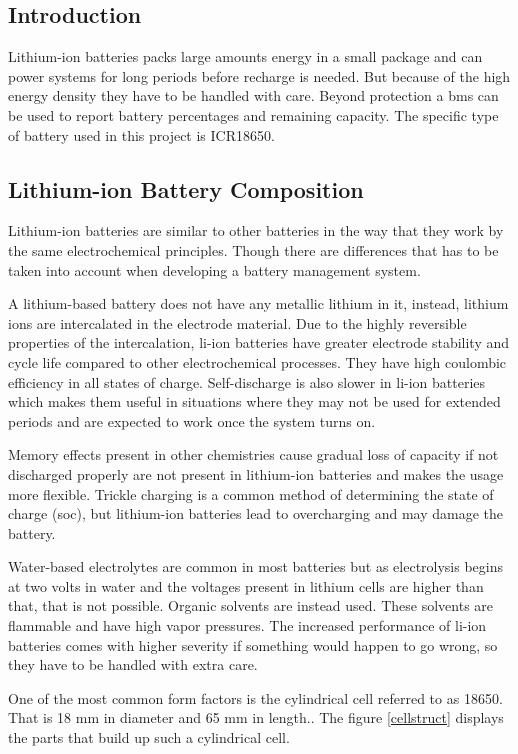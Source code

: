 \subsection{Introduction}
Lithium-ion batteries packs large amounts energy in a small package and can power systems for long periods before recharge is needed. But because of the high energy density they have to be handled with care. Beyond protection a \gls{bms} can be used to report battery percentages and remaining capacity. The specific type of battery used in this project is ICR18650.

\subsection{Lithium-ion Battery Composition}
Lithium-ion batteries are similar to other batteries in the way that they work by the same electrochemical principles. Though there are differences that has to be taken into account when developing a battery management system.

A lithium-based battery does not have any metallic lithium in it, instead, lithium ions are intercalated in the electrode material. Due to the highly reversible properties of the intercalation, \gls{li-ion} batteries have greater electrode stability and cycle life compared to other electrochemical processes. They have high coulombic efficiency in all states of charge. Self-discharge is also slower in \gls{li-ion} batteries which makes them useful in situations where they may not be used for extended periods and are expected to work once the system turns on.

Memory effects present in other chemistries cause gradual loss of capacity if not discharged properly are not present in lithium-ion batteries and makes the usage more flexible. Trickle charging is a common method of determining the state of charge (\gls{soc}), but lithium-ion batteries lead to overcharging and may damage the battery.

Water-based electrolytes are common in most batteries but as electrolysis begins at two volts in water and the voltages present in lithium cells are higher than that, that is not possible. Organic solvents are instead used. These solvents are flammable and have high vapor pressures. The increased performance of \gls{li-ion} batteries comes with higher severity if something would happen to go wrong, so they have to be handled with extra care.

One of the most common form factors is the cylindrical cell referred to as 18650. That is 18 mm in diameter and 65 mm in length.\cite{book26}. The figure \autoref{cellstruct} displays the parts that build up such a cylindrical cell.

